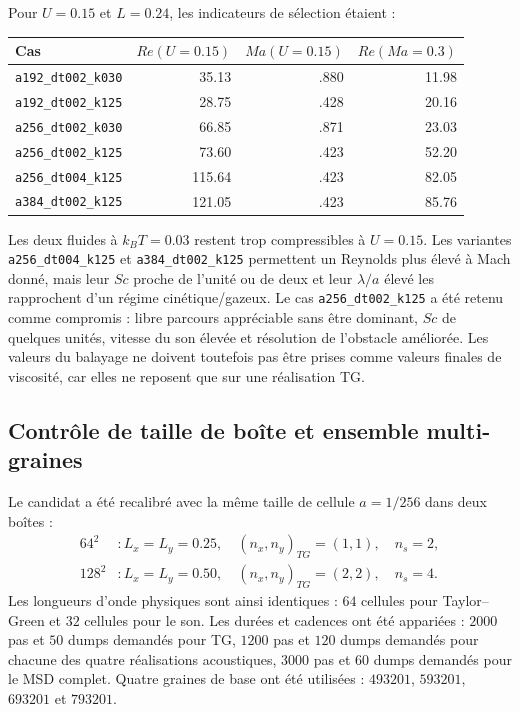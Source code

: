 \documentclass[11pt,a4paper]{article}
\begin{document}
Pour $U=0.15$ et $L=0.24$, les indicateurs de sélection étaient :

\begin{center}
\small
\begin{tabular}{lrrr}
\toprule
Cas & $Re(U=0.15)$ & $Ma(U=0.15)$ & $Re(Ma=0.3)$ \\
\midrule
\texttt{a192\_dt002\_k030} & 35.13 & .880 & 11.98 \\
\texttt{a192\_dt002\_k125} & 28.75 & .428 & 20.16 \\
\texttt{a256\_dt002\_k030} & 66.85 & .871 & 23.03 \\
\texttt{a256\_dt002\_k125} & 73.60 & .423 & 52.20 \\
\texttt{a256\_dt004\_k125} & 115.64 & .423 & 82.05 \\
\texttt{a384\_dt002\_k125} & 121.05 & .423 & 85.76 \\
\bottomrule
\end{tabular}
\end{center}

Les deux fluides à $k_BT=0.03$ restent trop compressibles à $U=0.15$. Les variantes \texttt{a256\_dt004\_k125} et \texttt{a384\_dt002\_k125} permettent un Reynolds plus élevé à Mach donné, mais leur $Sc$ proche de l'unité ou de deux et leur $\lambda/a$ élevé les rapprochent d'un régime cinétique/gazeux. Le cas \texttt{a256\_dt002\_k125} a été retenu comme compromis : libre parcours appréciable sans être dominant, $Sc$ de quelques unités, vitesse du son élevée et résolution de l'obstacle améliorée. Les valeurs du balayage ne doivent toutefois pas être prises comme valeurs finales de viscosité, car elles ne reposent que sur une réalisation TG.

\subsection{Contrôle de taille de boîte et ensemble multi-graines}
\label{sec:w1-multiseed-viscosity}

Le candidat a été recalibré avec la même taille de cellule $a=1/256$ dans deux boîtes :
\begin{equation}
\begin{aligned}
  64^2 &: L_x=L_y=0.25,\quad (n_x,n_y)_{TG}=(1,1),\quad n_{s}=2,\\
  128^2 &: L_x=L_y=0.50,\quad (n_x,n_y)_{TG}=(2,2),\quad n_{s}=4.
\end{aligned}
\end{equation}
Les longueurs d'onde physiques sont ainsi identiques : $64$ cellules pour Taylor--Green et $32$ cellules pour le son. Les durées et cadences ont été appariées : $2000$ pas et $50$ dumps demandés pour TG, $1200$ pas et $120$ dumps demandés pour chacune des quatre réalisations acoustiques, $3000$ pas et $60$ dumps demandés pour le MSD complet. Quatre graines de base ont été utilisées : $493201$, $593201$, $693201$ et $793201$.
\end{document}
